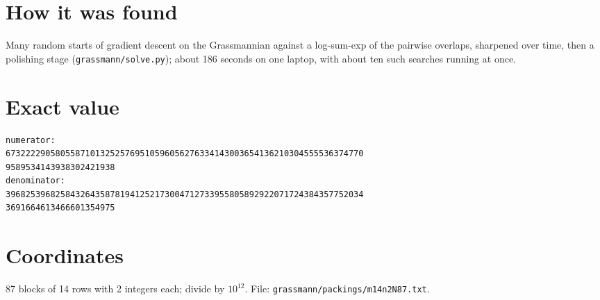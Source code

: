 \documentclass[11pt,a4paper]{article}
\begin{document}
\section{How it was found}
Many random starts of gradient descent on the Grassmannian against a log-sum-exp of the pairwise overlaps, sharpened over time, then a polishing stage (\texttt{grassmann/solve.py}); about 186 seconds on one laptop, with about ten such searches running at once.


\appendix
\section{Exact value}
{\small
\begin{verbatim}
numerator:
673222290580558710132525769510596056276334143003654136210304555536374770
9589534143938302421938
denominator:
396825396825843264358781941252173004712733955805892922071724384357752034
3691664613466601354975
\end{verbatim}}

\section{Coordinates}
87 blocks of 14 rows with 2 integers each; divide by $10^{12}$. File: \texttt{grassmann/packings/m14n2N87.txt}.
{\tiny
\begin{multicols}{4}
\end{multicols}}
\end{document}

